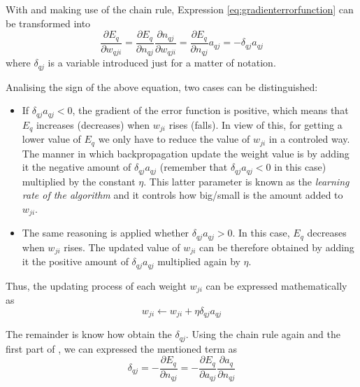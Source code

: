 With  and making use of the chain rule, Expression \ref{eq:gradienterrorfunction} can be transformed into
\begin{equation}
\frac{\partial E_{q}}{\partial w_{qji}}=
\frac{\partial E_{q}}{\partial n_{qj}}
\frac{\partial n_{qj}}{\partial w_{qji}}=
\frac{\partial E_{q}}{\partial n_{qj}} a_{qj}=
-\delta_{qj} a_{qj}
\label{eq:chainrulegradienterrorfunction}
\end{equation}
where $\delta_{qj}$ is a variable introduced just for a matter of notation.

Analising the sign of the above equation, two cases can be distinguished:
\begin{itemize}

\item If $\delta_{qj}a_{qj}<0$, the gradient of the error function is positive, which means that $E_{q}$ increases (decreases) when $w_{ji}$ rises (falls). In view of this, for getting a lower value of $E_{q}$ we only have to reduce the value of $w_{ji}$ in a controled way. The manner in which backpropagation update the weight value is by adding it the negative amount of $\delta_{qj}a_{qj}$ (remember that $\delta_{qj}a_{qj}<0$ in this case) multiplied by the constant $\eta$. This latter parameter is known as the \emph{learning rate of the algorithm} and it controls how big/small is the amount added to $w_{ji}$. 

\item The same reasoning is applied whether $\delta_{qj}a_{qj}>0$. In this case, $E_{q}$ decreases when $w_{ji}$ rises. The updated value of $w_{ji}$ can be therefore obtained by adding it the positive amount of $\delta_{qj}a_{qj}$ multiplied again by $\eta$.

\end{itemize}

Thus, the updating process of each weight $w_{ji}$ can be expressed mathematically as
\begin{equation}
w_{ji}\leftarrow w_{ji}+ \eta\delta_{qj}a_{qj}
\label{eq:updatingrule}
\end{equation}

The remainder is know how obtain the $\delta_{qj}$. Using the chain rule again and the first part of , we can expressed the mentioned term as
\begin{equation}
\delta_{qj}= 
- \frac{\partial E_{q}}{\partial n_{qj}}=
- \frac{\partial E_{q}}{\partial a_{qj}}
\frac{\partial a_{q}}{\partial n_{qj}}
\label{eq:factordelta}
\end{equation}

